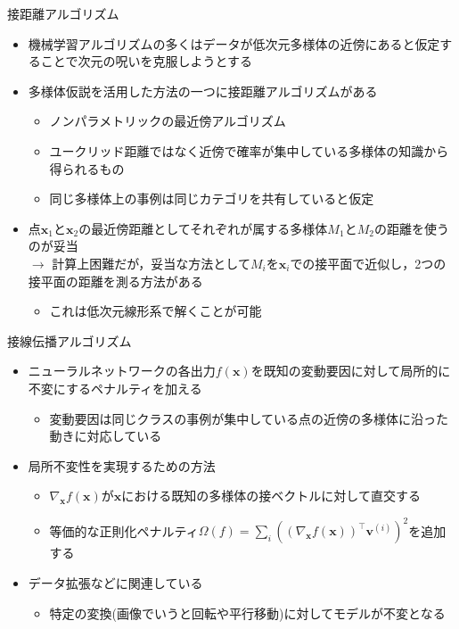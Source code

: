 \documentclass[dvipdfmx, 10pt]{beamer}
\begin{document}
\begin{frame}{接距離アルゴリズム}
  \begin{itemize}
    \item 機械学習アルゴリズムの多くはデータが低次元多様体の近傍にあると仮定することで次元の呪いを克服しようとする
    \item 多様体仮説を活用した方法の一つに\alert{接距離アルゴリズム}がある
    \begin{itemize}
      \item ノンパラメトリックの最近傍アルゴリズム
      \item ユークリッド距離ではなく近傍で確率が集中している多様体の知識から得られるもの
      \item 同じ多様体上の事例は同じカテゴリを共有していると仮定
    \end{itemize}
    \item 点$\bm{x}_{1}$と$\bm{x}_{2}$の最近傍距離としてそれぞれが属する多様体$M_{1}$と$M_{2}$の距離を使うのが妥当 \\
    $\rightarrow$ 計算上困難だが，妥当な方法として$M_{i}$を$\bm{x}_{i}$での接平面で近似し，2つの接平面の距離を測る方法がある
    \begin{itemize}
      \item これは低次元線形系で解くことが可能
    \end{itemize}
  \end{itemize}
\end{frame}


\begin{frame}{接線伝播アルゴリズム}
  \begin{itemize}
    \item ニューラルネットワークの各出力$f(\bm{x})$を既知の変動要因に対して局所的に不変にするペナルティを加える
    \begin{itemize}
      \item 変動要因は同じクラスの事例が集中している点の近傍の多様体に沿った動きに対応している
    \end{itemize}
    \item 局所不変性を実現するための方法
    \begin{itemize}
      \item $\nabla_{\boldsymbol{x}} f(\boldsymbol{x})$が$\bm{x}$における既知の多様体の接ベクトルに対して直交する
      \item 等価的な正則化ペナルティ$\Omega(f)=\sum_{i}\left(\left(\nabla_{\boldsymbol{x}} f(\boldsymbol{x})\right)^{\top} \boldsymbol{v}^{(i)}\right)^{2}$を追加する
    \end{itemize}
    \item データ拡張などに関連している
    \begin{itemize}
      \item 特定の変換(画像でいうと回転や平行移動)に対してモデルが不変となる
    \end{itemize}
  \end{itemize}
\end{frame}
\end{document}
